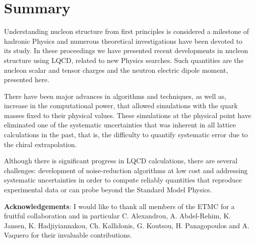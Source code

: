 \documentclass[epj]{webofc}
\begin{document}
\vspace*{-0.5cm}
\section{Summary}
\label{sec4}

Understanding nucleon structure from first principles is considered a milestone of hadronic
Physics and numerous theoretical investigations have been devoted to its study. In these proceedings
we have presented recent developments in nucleon structure using LQCD, related to new Physics searches.
Such quantities are the nucleon scalar and tensor charges and the neutron electric dipole moment, presented
here. 

There have been major advances in algorithms and techniques, as well as, increase in the computational power, that allowed 
simulations with the quark masses fixed to their physical values. These simulations at the physical point have eliminated one 
of the systematic uncertainties that was inherent in all lattice calculations in the past, that is, the difficulty to quantify 
systematic error due to the chiral extrapolation.

Although there is significant progress in LQCD calculations, there are several challenges: development of noise-reduction 
algorithms at low cost and addressing systematic uncertainties in order to compute reliably quantities 
that reproduce experimental data or can probe beyond the Standard Model Physics.

\bigskip
{\bf{Acknowledgements}}:
 I would like to thank all members of the ETMC for a fruitful collaboration and in particular 
 C. Alexandrou, A. Abdel-Rehim, K. Jansen, K. Hadjiyiannakou, Ch. Kallidonis,
G. Koutsou, H. Panagopoulos and A. Vaquero for their invaluable contributions.

%
%

\end{document}
